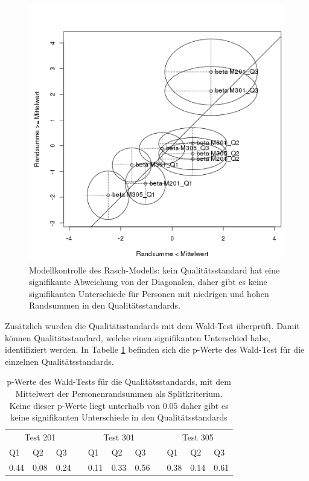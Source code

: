 \begin{figure}[htbp]

\centering
\includegraphics[width=0.8\linewidth]{graphics/GOFQ.png}
\caption{Modellkontrolle des Rasch-Modells: kein Qualitätsstandard hat eine signifikante Abweichung von der Diagonalen, daher gibt es keine signifikanten Unterschiede für Personen mit niedrigen und hohen Randsummen in den Qualitätsstandards. }
\label{fig:RaschKontrolle}
\end{figure}

Zusätzlich wurden die Qualitätsstandards mit dem Wald-Test überprüft. Damit können Qualitätsstandard, welche einen signifikanten Unterschied habe, identifiziert werden. In Tabelle \ref{tab:WaldTest} befinden sich die p-Werte des Wald-Test für die einzelnen Qualitätsstandards.

\begin{table}[htbp]
  \centering
\begin{tabular}{@{}lllllllllll@{}}
\toprule
 \multicolumn{3}{c}{Test 201} &&  \multicolumn{3}{c}{Test 301}&&  \multicolumn{3}{c}{Test 305}\\ 
    \cmidrule{1-3}\cmidrule{5-7}\cmidrule{9-11}
 Q1 & Q2 & Q3 && Q1 & Q2 & Q3 && Q1 & Q2 & Q3  \\ 
\midrule
  0.44 & 0.08 & 0.24 && 0.11 & 0.33 & 0.56 && 0.38 & 0.14 & 0.61   \\ 

\bottomrule
\end{tabular} 
  \caption{p-Werte des Wald-Tests für die Qualitätsstandards, mit dem Mittelwert der Personenrandsummen als Splitkriterium. Keine dieser p-Werte liegt unterhalb von $0.05$ daher gibt es keine signifikanten Unterschiede in den Qualitätsstandards }
  \label{tab:WaldTest}
\end{table}

